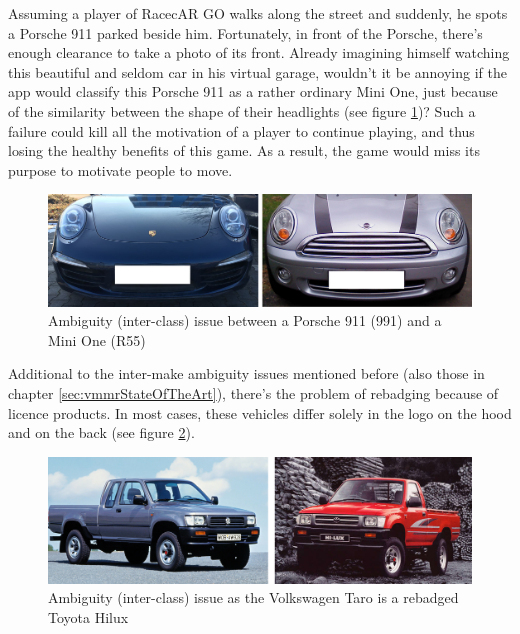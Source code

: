 Assuming a player of RacecAR GO walks along the street and suddenly, he spots a Porsche 911 parked beside him. Fortunately, in front of the Porsche, there's enough clearance to take a photo of its front. Already imagining himself watching this beautiful and seldom car in his virtual garage, wouldn't it be annoying if the app would classify this Porsche 911 as a rather ordinary Mini One, just because of the similarity between the shape of their headlights (see figure \ref{fig:ambiguityPorsche})? Such a failure could kill all the motivation of a player to continue playing, and thus losing the healthy benefits of this game. As a result, the game would miss its purpose to motivate people to move.

\begin{figure}[btph]
  \centering
        \includegraphics[width=.75\linewidth]{gfx/ambiguity_porsche_911_mini}
        \caption{Ambiguity (inter-class) issue between a Porsche 911 (991) and a Mini One (R55)}
        \label{fig:ambiguityPorsche}
\end{figure}
Additional to the inter-make ambiguity issues mentioned before (also those in chapter \ref{sec:vmmrStateOfTheArt}), there's the problem of rebadging because of licence products. In most cases, these vehicles differ solely in the logo on the hood and on the back (see figure \ref{fig:ambiguityRebadging}).

\begin{figure}[btph]
  \centering
        \includegraphics[width=.75\linewidth]{gfx/ambiguity_rebadging}
        \caption{Ambiguity (inter-class) issue as the Volkswagen Taro \citep{taro} is a rebadged Toyota Hilux \citep{hilux}}
        \label{fig:ambiguityRebadging}
\end{figure}

